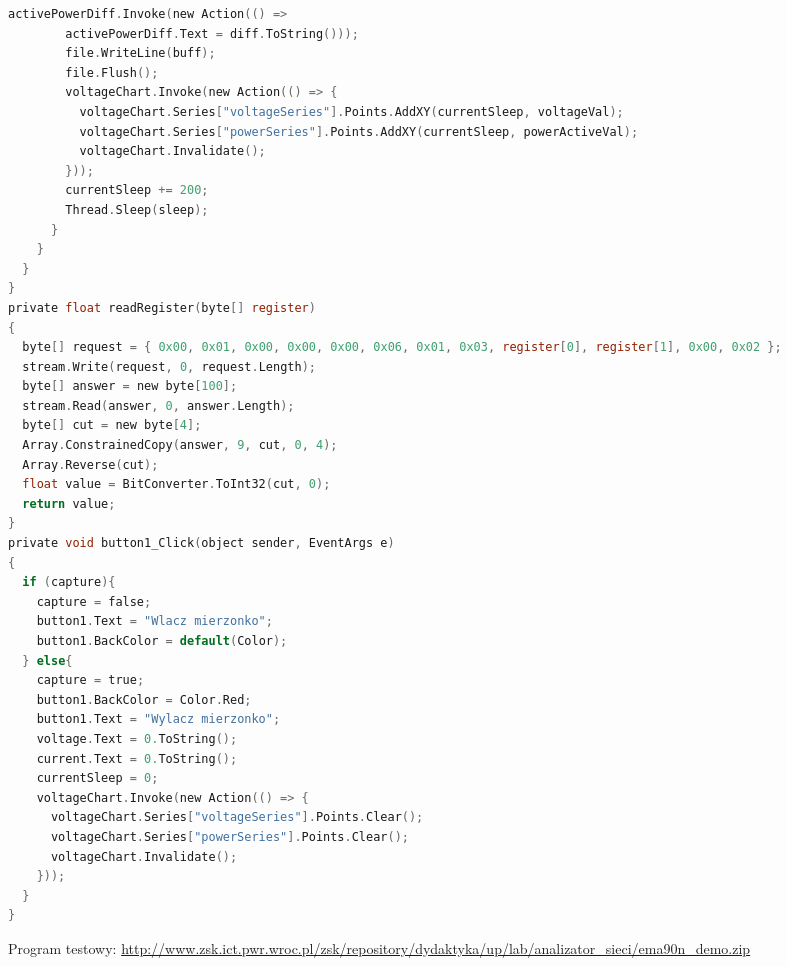 \documentclass[12pt]{article}
\begin{document}
\begin{lstlisting}[language=C, caption=Klasa Form zarządzająca odczytywaniem danych]
        activePowerDiff.Invoke(new Action(() => 
        activePowerDiff.Text = diff.ToString()));
        file.WriteLine(buff);
        file.Flush();
        voltageChart.Invoke(new Action(() => {
          voltageChart.Series["voltageSeries"].Points.AddXY(currentSleep, voltageVal);
          voltageChart.Series["powerSeries"].Points.AddXY(currentSleep, powerActiveVal);
          voltageChart.Invalidate();
        }));
        currentSleep += 200;
        Thread.Sleep(sleep);
      }
    }
  }
}
private float readRegister(byte[] register) 
{
  byte[] request = { 0x00, 0x01, 0x00, 0x00, 0x00, 0x06, 0x01, 0x03, register[0], register[1], 0x00, 0x02 };
  stream.Write(request, 0, request.Length);
  byte[] answer = new byte[100];
  stream.Read(answer, 0, answer.Length);
  byte[] cut = new byte[4];
  Array.ConstrainedCopy(answer, 9, cut, 0, 4);
  Array.Reverse(cut);
  float value = BitConverter.ToInt32(cut, 0);
  return value;
}
private void button1_Click(object sender, EventArgs e)
{
  if (capture){
    capture = false;
    button1.Text = "Wlacz mierzonko";
    button1.BackColor = default(Color);
  } else{
    capture = true;
    button1.BackColor = Color.Red;
    button1.Text = "Wylacz mierzonko";
    voltage.Text = 0.ToString();
    current.Text = 0.ToString();
    currentSleep = 0;
    voltageChart.Invoke(new Action(() => {
      voltageChart.Series["voltageSeries"].Points.Clear();
      voltageChart.Series["powerSeries"].Points.Clear();
      voltageChart.Invalidate();
    }));
  }
}
\end{lstlisting}

\newpage
\begin{thebibliography}{9}
  Program testowy: \url{http://www.zsk.ict.pwr.wroc.pl/zsk/repository/dydaktyka/up/lab/analizator_sieci/ema90n_demo.zip}
\end{thebibliography}
\end{document}

